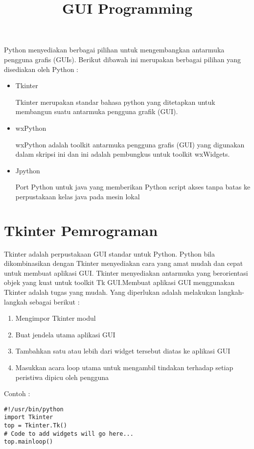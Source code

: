 \documentclass [12pt,a4paper,notitlepage,oneside,bahasa]{article}
\begin{document}
\title{\textbf GUI Programming}
\maketitle


Python menyediakan berbagai pilihan untuk mengembangkan antarmuka pengguna grafis (GUIs). 
Berikut dibawah ini merupakan berbagai pilihan yang disediakan oleh Python :
\begin{itemize}
\item Tkinter \par
Tkinter merupakan standar bahasa python yang ditetapkan untuk membangun suatu antarmuka pengguna grafik (GUI). 
\item wxPython \par
wxPython adalah toolkit antarmuka pengguna grafis (GUI) yang digunakan dalam skripsi ini dan ini adalah pembungkus untuk toolkit wxWidgets.
\item Jpython \par
Port Python untuk java yang memberikan Python script akses tanpa batas ke perpustakaan kelas java pada mesin lokal \par
\end{itemize}
\vspace{12pt}
\noindent 
\section{\textbf Tkinter Pemrograman}
Tkinter adalah perpustakaan GUI standar untuk Python. Python bila dikombinasikan dengan Tkinter menyediakan cara yang amat mudah dan cepat untuk membuat aplikasi GUI. Tkinter menyediakan antarmuka yang berorientasi objek yang kuat untuk toolkit Tk GUI.Membuat aplikasi GUI menggunakan Tkinter adalah tugas yang mudah. Yang diperlukan adalah melakukan langkah-langkah sebagai berikut : 
\begin{enumerate} 
	\item Mengimpor Tkinter modul 
	\item Buat jendela utama aplikasi GUI
	\item Tambahkan satu atau lebih dari widget tersebut diatas ke aplikasi GUI
	\item Masukkan acara loop utama untuk mengambil tindakan terhadap setiap peristiwa dipicu oleh pengguna
\end{enumerate}



\newpage

\vspace{12pt}
\vspace{12pt}
\noindent 
Contoh : 
\begin{verbatim}
#!/usr/bin/python 
import Tkinter 
top = Tkinter.Tk()
# Code to add widgets will go here...
top.mainloop()
\end{verbatim}
\end{document}
